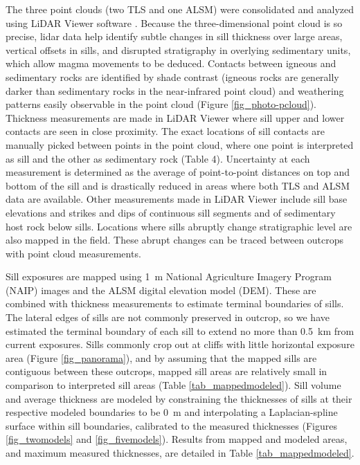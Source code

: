 The three point clouds (two TLS and one ALSM) were consolidated and analyzed using LiDAR Viewer software \citep{kreylos2008immersive}. Because the three-dimensional point cloud is so precise, lidar data help identify subtle changes in sill thickness over large areas, vertical offsets in sills, and disrupted stratigraphy in overlying sedimentary units, which allow magma movements to be deduced. Contacts between igneous and sedimentary rocks are identified by shade contrast (igneous rocks are generally darker than sedimentary rocks in the near-infrared point cloud) and weathering patterns easily observable in the point cloud (Figure \ref{fig_photo-pcloud}). Thickness measurements are made in LiDAR Viewer where sill upper and lower contacts are seen in close proximity. The exact locations of sill contacts are manually picked between points in the point cloud, where one point is interpreted as sill and the other as sedimentary rock (Table 4). Uncertainty at each measurement is determined as the average of point-to-point distances on top and bottom of the sill and is drastically reduced in areas where both TLS and ALSM data are available. Other measurements made in LiDAR Viewer include sill base elevations and strikes and dips of continuous sill segments and of sedimentary host rock below sills. Locations where sills abruptly change stratigraphic level are also mapped in the field. These abrupt changes can be traced between outcrops with point cloud measurements.

Sill exposures are mapped using 1~m National Agriculture Imagery Program (NAIP) images and the ALSM digital elevation model (DEM). These are combined with thickness measurements to estimate terminal boundaries of sills. The lateral edges of sills are not commonly preserved in outcrop, so we have estimated the terminal boundary of each sill to extend no more than 0.5~km from current exposures. Sills commonly crop out at cliffs with little horizontal exposure area (Figure \ref{fig_panorama}), and by assuming that the mapped sills are contiguous between these outcrops, mapped sill areas are relatively small in comparison to interpreted sill areas (Table \ref{tab_mappedmodeled}). Sill volume and average thickness are modeled by constraining the thicknesses of sills at their respective modeled boundaries to be 0~m and interpolating a Laplacian-spline surface within sill boundaries, calibrated to the measured thicknesses (Figures \ref{fig_twomodels} and \ref{fig_fivemodels}). Results from mapped and modeled areas, and maximum measured thicknesses, are detailed in Table \ref{tab_mappedmodeled}.

